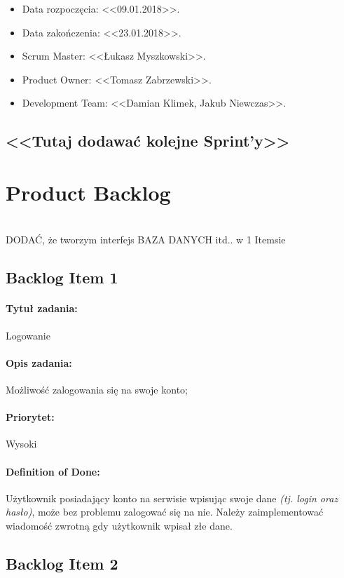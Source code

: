 \documentclass[a4paper]{article}
\begin{document}
	\begin{itemize}
		\item Data rozpoczęcia: <<09.01.2018>>.
		\item  Data zakończenia: <<23.01.2018>>.
		\item Scrum Master: <<Łukasz Myszkowski>>.
		\item Product Owner: <<Tomasz Zabrzewski>>.
		\item Development Team: <<Damian Klimek, Jakub Niewczas>>.
	\end{itemize}

	
	\subsection*{<<Tutaj dodawać kolejne Sprint'y>>}
	
	\section{Product Backlog}
	
	\\ DODAĆ, że tworzym interfejs BAZA DANYCH itd.. w 1 Itemsie
	
	\subsection{Backlog Item 1}
	\paragraph{Tytuł zadania:} Logowanie
	\paragraph{Opis zadania:} Możliwość zalogowania się na swoje konto;
	\paragraph{Priorytet:} Wysoki
	\paragraph{Definition of Done:} Użytkownik posiadający konto na serwisie wpisując swoje dane \emph{(tj. login oraz hasło)}, może bez problemu zalogować się na nie. Należy zaimplementować wiadomość zwrotną gdy użytkownik wpisał złe dane.
	
	\subsection{Backlog Item 2}
\end{document}
